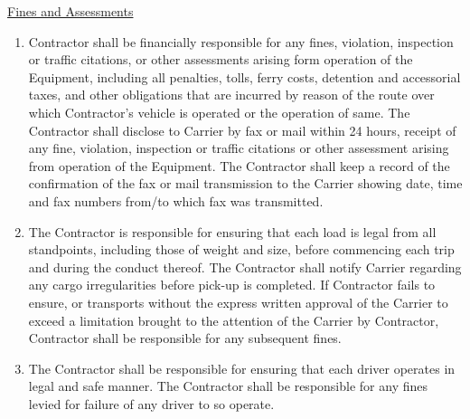 \underline{Fines and Assessments}
\begin{enumerate}
    \item Contractor shall be financially responsible for any fines,
    violation, inspection or traffic citations, or other assessments
    arising form operation of the Equipment, including all penalties,
    tolls, ferry costs, detention and accessorial taxes, and other
    obligations that are incurred by reason of the route over which
    Contractor's vehicle is operated or the operation of same. The
    Contractor shall disclose to Carrier by fax or mail within 24 hours,
    receipt of any fine, violation, inspection or traffic citations or
    other assessment arising from operation of the Equipment. The
    Contractor shall keep a record of the confirmation of the fax or mail
    transmission to the Carrier showing date, time and fax numbers from/to
    which fax was transmitted.

    \item The Contractor is responsible for ensuring that each load is
    legal from all standpoints, including those of weight and size, before
    commencing each trip and during the conduct thereof. The Contractor
    shall notify Carrier regarding any cargo irregularities before pick-up
    is completed. If Contractor fails to ensure, or transports without the
    express written approval of the Carrier to exceed a limitation brought
    to the attention of the Carrier by Contractor, Contractor shall be
    responsible for any subsequent fines.

    \item The Contractor shall be responsible for ensuring that each driver
    operates in legal and safe manner. The Contractor shall be responsible
    for any fines levied for failure of any driver to so operate.
\end{enumerate}